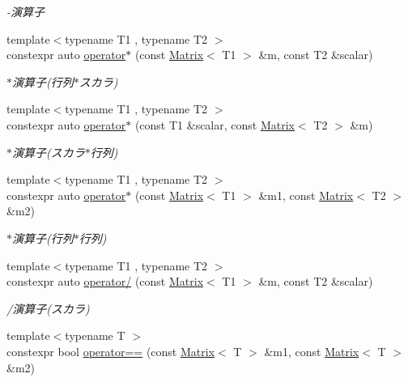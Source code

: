 \begin{DoxyCompactItemize}
\begin{DoxyCompactList}\small\item\em -\/演算子 \end{DoxyCompactList}\item 
{\footnotesize template$<$typename T1 , typename T2 $>$ }\\constexpr auto \mbox{\hyperlink{namespacesaki_ad348e50faa98837b804c503c3198afc3}{operator$\ast$}} (const \mbox{\hyperlink{classsaki_1_1_matrix}{Matrix}}$<$ T1 $>$ \&m, const T2 \&scalar)
\begin{DoxyCompactList}\small\item\em $\ast$演算子(行列$\ast$スカラ) \end{DoxyCompactList}\item 
{\footnotesize template$<$typename T1 , typename T2 $>$ }\\constexpr auto \mbox{\hyperlink{namespacesaki_aed1e93efca8468e08d2f569b50c328e0}{operator$\ast$}} (const T1 \&scalar, const \mbox{\hyperlink{classsaki_1_1_matrix}{Matrix}}$<$ T2 $>$ \&m)
\begin{DoxyCompactList}\small\item\em $\ast$演算子(スカラ$\ast$行列) \end{DoxyCompactList}\item 
{\footnotesize template$<$typename T1 , typename T2 $>$ }\\constexpr auto \mbox{\hyperlink{namespacesaki_a8a8f2d1ac91826453735810908a3c32d}{operator$\ast$}} (const \mbox{\hyperlink{classsaki_1_1_matrix}{Matrix}}$<$ T1 $>$ \&m1, const \mbox{\hyperlink{classsaki_1_1_matrix}{Matrix}}$<$ T2 $>$ \&m2)
\begin{DoxyCompactList}\small\item\em $\ast$演算子(行列$\ast$行列) \end{DoxyCompactList}\item 
{\footnotesize template$<$typename T1 , typename T2 $>$ }\\constexpr auto \mbox{\hyperlink{namespacesaki_af54405ace3d571365d95cfecb624c611}{operator/}} (const \mbox{\hyperlink{classsaki_1_1_matrix}{Matrix}}$<$ T1 $>$ \&m, const T2 \&scalar)
\begin{DoxyCompactList}\small\item\em /演算子(スカラ) \end{DoxyCompactList}\item 
{\footnotesize template$<$typename T $>$ }\\constexpr bool \mbox{\hyperlink{namespacesaki_acecebb6fed194d4ca5b6f123b5ed7563}{operator==}} (const \mbox{\hyperlink{classsaki_1_1_matrix}{Matrix}}$<$ T $>$ \&m1, const \mbox{\hyperlink{classsaki_1_1_matrix}{Matrix}}$<$ T $>$ \&m2)

\end{DoxyCompactItemize}
